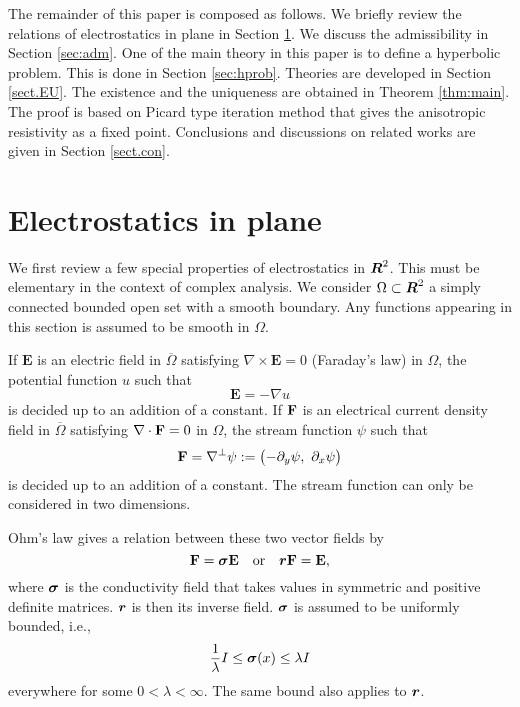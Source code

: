 \documentclass[11pt]{amsart}
\theoremstyle{plain}
\theoremstyle{remark}
\numberwithin{equation}{section}
\numberwithin{Thm}{section}
\def\R{\mbox{\boldmath$R$}}
\def\F{{\bf F}}
\def\E{{\bf E}}
\def\r{{\bf r}}
\def\Sigma{\mbox{\boldmath$\sigma$}}
\def\r{\mbox{\boldmath$r$}}
\begin{document}
The remainder of this paper is composed as follows. We briefly review the relations of electrostatics in plane in Section \ref{sec:review}. We discuss the admissibility in Section \ref{sec:adm}. One of the main theory in this paper is to define a hyperbolic problem. This is done in Section \ref{sec:hprob}. Theories are developed in Section \ref{sect.EU}. The existence and the uniqueness are obtained in Theorem \ref{thm:main}. The proof is based on Picard type iteration method that gives the anisotropic resistivity as a fixed point. Conclusions and discussions on related works are given in Section \ref{sect.con}. 

\section{Electrostatics in plane} \label{sec:review}

We first review a few special properties of electrostatics in $\R^2$. This must be elementary in the context of complex analysis. We consider $\Omega\subset \R^2 $ a simply connected bounded open set with a smooth boundary. Any functions appearing in this section is assumed to be smooth in $\Omega$.

If $\mathbf{E}$ is an electric field in $\overline\Omega$ satisfying $\nabla\times \mathbf{E} = 0$ (Faraday's law) in $\Omega$, the potential function $u$ such that
$$ \mathbf{E} = -\nabla u$$
is decided up to an addition of a constant. If $\F$ is an electrical current density field in $\overline\Omega$  satisfying  $\nabla\cdot\F=0$ in $\Omega$, the stream function $\psi$ such that
$$
\F=\nabla^\perp\psi:= \begin{pmatrix} -\partial_y \psi,~ \partial_x \psi \end{pmatrix}
$$
is decided up to an addition of a constant. The stream function can only be considered in two dimensions.

Ohm's law gives a relation between these two vector fields by
\begin{equation}
\F=\Sigma \E \quad \text{or} \quad \r\F=\E, \label{eqn:OhmsLaw0}
\end{equation}
where $\Sigma$ is the conductivity field that takes values in symmetric and positive definite matrices. $\r$ is then its inverse field. $\Sigma$ is assumed to be uniformly bounded, i.e.,
\begin{equation} \label{eigbound}
 \frac{1}{\lambda} I \le \Sigma(x) \le \lambda I
\end{equation}
everywhere for some $0<\lambda <\infty$. The same bound also applies to $\r$.
\end{document}
